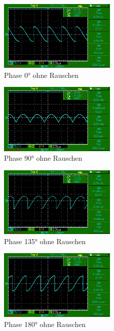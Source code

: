 \begin{figure}
    \centering
    \includegraphics[width=0.5\textwidth]{bilder/MAP001.png}
    \caption{Phase 0° ohne Rauschen}        
    \label{fig:MAP001}
\end{figure}

\begin{figure}
    \centering
    \includegraphics[width=0.5\textwidth]{bilder/MAP002.png}
    \caption{Phase 90° ohne Rauschen}        
    \label{fig:MAP002}
\end{figure}

\begin{figure}
    \centering
    \includegraphics[width=0.5\textwidth]{bilder/MAP005.png}
    \caption{Phase 135° ohne Rauschen}        
    \label{fig:MAP005}
\end{figure}

\begin{figure}
    \centering
    \includegraphics[width=0.5\textwidth]{bilder/MAP003.png}
    \caption{Phase 180° ohne Rauschen}        
    \label{fig:MAP003}
\end{figure}

